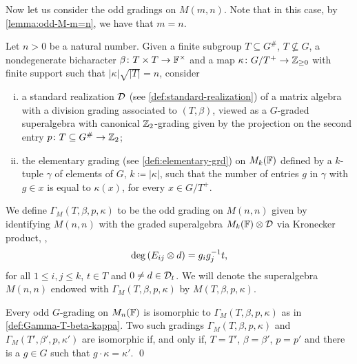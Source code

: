 
Now let us consider the odd gradings on $M(m,n)$. 
Note that in this case, by \cref{lemma:odd-M-m=n}, we have that $m = n$. 


\begin{defi}\label{def:Gamma-T-beta-kappa-odd}
    Let $n > 0$ be a natural number. 
    Given a finite subgroup $T \subseteq G^\#$, $T\not\subseteq G$, a nondegenerate bicharacter $\beta\colon T\times T \to \mathbb{F}^\times$ and a map $\kappa\colon G/T^+ \to \mathbb{Z}_{\geq 0}$ with finite support such that $|\kappa| \sqrt{|T|} = n$, consider 
    \begin{enumerate}[(i)]
        \item a standard realization $\mathcal{D}$ (see \cref{def:standard-realization}) of a matrix algebra with a division grading associated to $(T,\beta)$, viewed as a $G$-graded superalgebra with canonical $\mathbb{Z}_2$-grading given by the projection on the second entry $p\colon T \subseteq G^\# \to \mathbb{Z}_2$;
        \item the elementary grading (see \cref{defi:elementary-grd}) on $M_{k}(\mathbb{F})$ defined by a $k$-tuple $\gamma$ 
        of elements of $G$, $k \coloneqq |\kappa|$, such that the number of entries $g$ in $\gamma$ with $g\in x$ is equal to $\kappa (x)$, for every $x\in G/T^+$. 
    \end{enumerate}
    We define $\Gamma_M (T, \beta, p, \kappa)$ to be the odd grading on $M(n,n)$ given by identifying $M(n,n)$ with the graded superalgebra $M_k(\mathbb{F}) \otimes \mathcal{D}$ via Kronecker product, \ie,
    \[
        \deg \left( E_{ij} \otimes d \right) = g_ig_j^{-1} t,
    \] 
    for all $1\leq i, j \leq k$, $t\in T$ and $0 \neq d \in \mathcal{D}_t$. 
    We will denote the superalgebra $M(n,n)$ endowed with $\Gamma_M (T, \beta, p, \kappa)$ by $M (T, \beta, p, \kappa)$. 
\end{defi}

\begin{cor}\label{cor:iso-M-odd}
    Every odd $G$-grading on $M_n(\mathbb{F})$ is isomorphic to $\Gamma_M (T, \beta, p, \kappa)$ as in \cref{def:Gamma-T-beta-kappa}. 
    Two such gradings $\Gamma_M (T, \beta, p, \kappa)$ and $\Gamma_M (T', \beta', p, \kappa')$ are isomorphic if, and only if, $T = T'$, $\beta = \beta'$, $p = p'$ and there is a $g\in G$ such that $g\cdot \kappa = \kappa'$. \qed
\end{cor}

